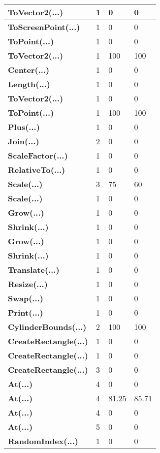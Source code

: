 \documentclass[a4paper,10pt]{article}
\begin{document}
\begin{longtable}[l]{|l|l|l|l|}
\hline
\textbf{ToVector2(...)} & 1 & 0 & 0\\
\hline
\textbf{ToScreenPoint(...)} & 1 & 0 & 0\\
\hline
\textbf{ToPoint(...)} & 1 & 0 & 0\\
\hline
\textbf{ToVector2(...)} & 1 & 100 & 100\\
\hline
\textbf{Center(...)} & 1 & 0 & 0\\
\hline
\textbf{Length(...)} & 1 & 0 & 0\\
\hline
\textbf{ToVector2(...)} & 1 & 0 & 0\\
\hline
\textbf{ToPoint(...)} & 1 & 100 & 100\\
\hline
\textbf{Plus(...)} & 1 & 0 & 0\\
\hline
\textbf{Join(...)} & 2 & 0 & 0\\
\hline
\textbf{ScaleFactor(...)} & 1 & 0 & 0\\
\hline
\textbf{RelativeTo(...)} & 1 & 0 & 0\\
\hline
\textbf{Scale(...)} & 3 & 75 & 60\\
\hline
\textbf{Scale(...)} & 1 & 0 & 0\\
\hline
\textbf{Grow(...)} & 1 & 0 & 0\\
\hline
\textbf{Shrink(...)} & 1 & 0 & 0\\
\hline
\textbf{Grow(...)} & 1 & 0 & 0\\
\hline
\textbf{Shrink(...)} & 1 & 0 & 0\\
\hline
\textbf{Translate(...)} & 1 & 0 & 0\\
\hline
\textbf{Resize(...)} & 1 & 0 & 0\\
\hline
\textbf{Swap(...)} & 1 & 0 & 0\\
\hline
\textbf{Print(...)} & 1 & 0 & 0\\
\hline
\textbf{CylinderBounds(...)} & 2 & 100 & 100\\
\hline
\textbf{CreateRectangle(...)} & 1 & 0 & 0\\
\hline
\textbf{CreateRectangle(...)} & 1 & 0 & 0\\
\hline
\textbf{CreateRectangle(...)} & 3 & 0 & 0\\
\hline
\textbf{At(...)} & 4 & 0 & 0\\
\hline
\textbf{At(...)} & 4 & 81.25 & 85.71\\
\hline
\textbf{At(...)} & 4 & 0 & 0\\
\hline
\textbf{At(...)} & 5 & 0 & 0\\
\hline
\textbf{RandomIndex(...)} & 1 & 0 & 0\\

\end{longtable}
\end{document}
